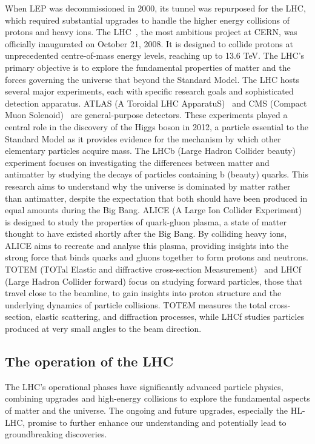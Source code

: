    When LEP was decommissioned in 2000, its tunnel was repurposed for the LHC, which required substantial upgrades to 
    handle the higher energy collisions of protons and heavy ions. 
    The LHC~\cite{Evans:2008zzb}, the most ambitious project at CERN, was officially inaugurated on October 21, 2008. 
    It is designed to collide protons at unprecedented centre-of-mass energy levels, reaching up to 13.6 TeV. The LHC's primary 
    objective is to explore the fundamental properties of matter and the forces governing the universe that beyond the Standard Model.
    The LHC hosts several major experiments, each with specific research goals and sophisticated detection apparatus.
    ATLAS (A Toroidal LHC ApparatuS)~\cite{PERF-2007-01} and CMS (Compact Muon Solenoid)~\cite{CMS-CMS-00-001} are general-purpose detectors. These experiments 
    played a central role in the discovery of the Higgs boson in 2012, a particle essential to the Standard Model as 
    it provides evidence for the mechanism by which other elementary particles acquire mass. 
    The LHCb (Large Hadron Collider beauty)~\cite{LHCb:2008vvz} experiment focuses on investigating the differences between matter and antimatter by studying the decays 
    of particles containing b (beauty) quarks. This research aims to understand why the universe is dominated by 
    matter rather than antimatter, despite the expectation that both should have been produced in equal amounts 
    during the Big Bang.
    ALICE (A Large Ion Collider Experiment)~\cite{ALICE:2008ngc} is designed to study the properties of quark-gluon plasma, a state of matter thought to have existed shortly 
    after the Big Bang. By colliding heavy ions, ALICE aims to recreate and analyse this plasma, providing insights 
    into the strong force that binds quarks and gluons together to form protons and neutrons.
    TOTEM (TOTal Elastic and diffractive cross-section Measurement)~\cite{totem_2008} and LHCf (Large Hadron Collider forward) focus on studying forward particles, 
    those that travel close to the beamline, to gain insights into proton structure and the underlying dynamics of particle collisions. 
    TOTEM measures the total cross-section, elastic scattering, and diffraction processes, while LHCf studies particles produced at very small 
    angles to the beam direction.

    \subsection{The operation of the LHC}
        The LHC's operational phases have significantly advanced particle physics, combining upgrades and high-energy 
        collisions to explore the fundamental aspects of matter and the universe. The ongoing and future upgrades, especially 
        the HL-LHC, promise to further enhance our understanding and potentially lead to groundbreaking discoveries. 
